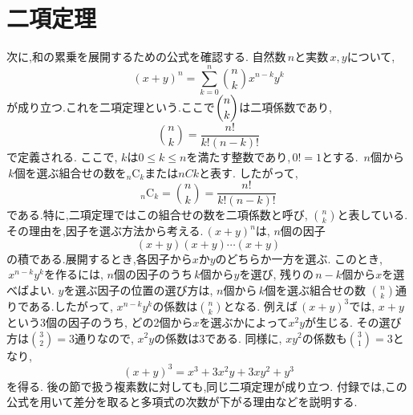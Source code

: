
  \section{二項定理}
    次に,和の累乗を展開するための公式を確認する.
    自然数$\,n$と実数$\,x,y$について,
    \[
      (x+y)^n=\sum_{k=0}^{n}\binom{n}{k}x^{n-k}y^{k}
    \]
    が成り立つ.これを二項定理という.ここで$\dbinom{n}{k}$は二項係数であり,
    \[
      \binom{n}{k}=\frac{n!}{k!(n-k)!}
    \]
    で定義される. ここで,\,$\,k$は$0\le k\le n$を満たす整数であり,\,$0!=1$とする.
    $\,n$個から$\,k$個を選ぶ組合せの数を${}_n\mathrm{C}_k$または$nCk$と表す.
    したがって,
    \[
      {}_n\mathrm{C}_k=\binom{n}{k}
      =\frac{n!}{k!(n-k)!}
    \]
    である.特に,二項定理ではこの組合せの数を二項係数と呼び,
    $\binom{n}{k}$と表している.
    その理由を,因子を選ぶ方法から考える.\,$(x+y)^n$は,\,$\,n$個の因子
    \[
      (x+y)(x+y)\cdots(x+y)
    \]
    の積である.展開するとき,各因子から$x$か$y$のどちらか一方を選ぶ.
    このとき,\,$\,x^{n-k}y^k$を作るには,\,$\,n$個の因子のうち$\,k$個から$y$を選び,
    残りの$\,n-k$個から$x$を選べばよい.
    $y$を選ぶ因子の位置の選び方は,\,$\,n$個から$\,k$個を選ぶ組合せの数
    $\binom{n}{k}$通りである.したがって,\,$\,x^{n-k}y^k$の係数は$\binom{n}{k}$となる.
    例えば$\,(x+y)^3$では,\,$\,x+y$という3個の因子のうち,
    どの2個から$x$を選ぶかによって$x^2y$が生じる.
    その選び方は$\binom{3}{2}=3$通りなので,\,$\,x^2y$の係数は$3$である.
    同様に,\,$\,xy^2$の係数も$\binom{3}{1}=3$となり,
    \[
      (x+y)^3=x^3+3x^2y+3xy^2+y^3
    \]
    を得る.
    後の節で扱う複素数に対しても,同じ二項定理が成り立つ.
    付録では,この公式を用いて差分を取ると多項式の次数が下がる理由などを説明する.
